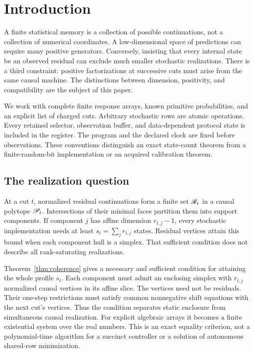 \section{Introduction}
A finite statistical memory is a collection of possible continuations,
not a collection of numerical coordinates. A low-dimensional space of
predictions can require many positive generators. Conversely, insisting
that every internal state be an observed residual can exclude much smaller
stochastic realizations. There is a third constraint: positive
factorizations at successive cuts must arise from the same causal machine.
The distinctions between dimension, positivity, and compatibility are the
subject of this paper.

We work with complete finite response arrays, known primitive probabilities,
and an explicit list of charged cuts. Arbitrary stochastic rows are atomic
operations. Every retained selector, observation buffer, and data-dependent
protocol state is included in the register. The program and the declared
clock are fixed before observations. These conventions distinguish an exact
state-count theorem from a finite-random-bit implementation or an acquired
calibration theorem.

\subsection{The realization question}
At a cut $t$, normalized residual continuations form a finite set
$\mathscr R_t$ in a causal polytope $\mathscr P_t$. Intersections of their minimal faces
partition them into support components. If component $j$ has affine
dimension $r_{t,j}-1$, every stochastic implementation needs at least
$s_t=\sum_jr_{t,j}$ states. Residual vertices attain this bound when each
component hull is a simplex. That sufficient condition does not describe
all rank-saturating realizations.

Theorem~\ref{thm:coherence} gives a necessary and sufficient condition for
attaining the whole profile $s_t$. Each component must admit an enclosing
simplex with $r_{t,j}$ normalized causal vertices in its affine slice. The
vertices need not be residuals. Their one-step restrictions must satisfy
common nonnegative shift equations with the next cut's vertices. Thus the
condition separates static enclosure from simultaneous causal realization.
For explicit algebraic arrays it becomes a finite existential system over
the real numbers. This is an exact equality criterion, not a polynomial-time
algorithm for a succinct controller or a solution of autonomous
shared-row minimization.


